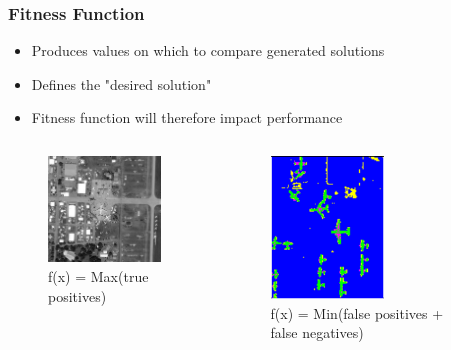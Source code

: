 \documentclass{beamer}
\begin{document}
\begin{frame}
\frametitle{Fitness Function}

	\begin{itemize}
		\item Produces values on which to compare generated solutions
		\item Defines the "desired solution"
		\item Fitness function will therefore impact performance
	\end{itemize}
	
	\begin{columns}[c]
	\begin{figure}
	\centering
		\includegraphics[width=30mm ]{resources/airplane-original-min.png}
		\caption{f(x) = Max(true positives)}
	\end{figure}

	\begin{figure}
	\centering
		\includegraphics[width=30mm ]{resources/airplane-result.png}
		\caption{f(x) = Min(false positives + false negatives)}
	\end{figure}
	\end{columns}

\end{frame}

\end{document}
